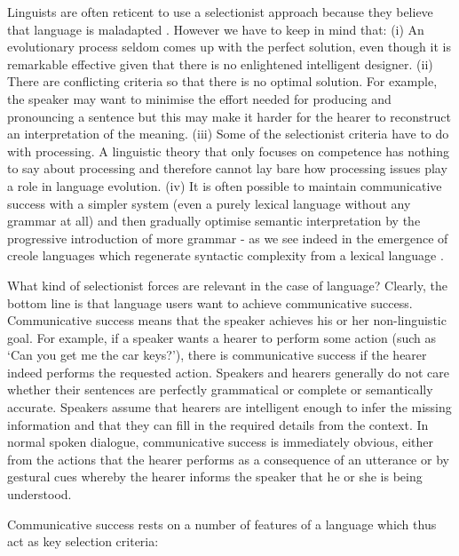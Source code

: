 Linguists are often reticent to use a selectionist approach because they believe that language is 
maladapted \citep{Boeckx:2005}. However we have to keep in mind that: (i) An evolutionary process 
seldom comes up with the perfect solution, even though it is remarkable effective given that there is no 
enlightened intelligent designer. (ii) There are conflicting criteria so that there is no optimal solution. 
For example, the speaker may want to minimise the effort needed for producing and pronouncing a sentence but this 
may make it harder for the hearer to reconstruct an interpretation of the meaning. (iii) Some of the selectionist 
criteria have to do with processing. A linguistic theory that only focuses on competence has nothing to say about 
processing and therefore cannot lay bare how processing issues play a role in language evolution. (iv) It is often possible 
to maintain communicative success with a simpler system (even a purely lexical language without any grammar at all) and then 
gradually optimise semantic interpretation by the progressive introduction of more grammar - as we see indeed 
in the emergence of creole languages which regenerate syntactic complexity from 
a lexical language \citep{Mufwene:2001}. 

What kind of selectionist forces are relevant in the case of language? 
Clearly, the bottom line is that language users want to achieve {\bfshape communicative success}. 
Communicative success means that the speaker achieves his or her non-linguistic goal. For example, if a speaker
wants a hearer to perform some action (such as `Can you get me the car keys?'), there is communicative success if 
the hearer indeed performs the requested action. Speakers and hearers generally do not care whether their sentences
are perfectly grammatical or complete or semantically accurate. Speakers assume that hearers are intelligent enough
to infer the missing information and that they can fill in the required details from the context. 
In normal spoken dialogue, communicative success is immediately obvious, either 
from the actions that the hearer performs as a consequence of an utterance or by gestural cues whereby 
the hearer informs the speaker that he or she is being understood. 

Communicative success rests on a number of features of a language which thus act as key 
selection criteria: 

